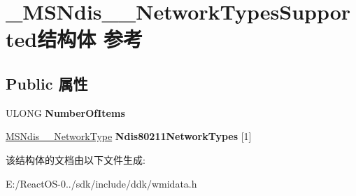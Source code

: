 \hypertarget{struct___m_s_ndis__80211___network_types_supported}{}\section{\+\_\+\+M\+S\+Ndis\+\_\+\_\+\+Network\+Types\+Supported结构体 参考}
\label{struct___m_s_ndis__80211___network_types_supported}
\subsection*{Public 属性}
\begin{DoxyCompactItemize}
\item 
\mbox{\label{struct___m_s_ndis__80211___network_types_supported_ab60604679e5fddfd0d099ff624b82bf8}} 
U\+L\+O\+NG {\bfseries Number\+Of\+Items}
\item 
\mbox{\label{struct___m_s_ndis__80211___network_types_supported_a9e5462e6a1bcb913862b9ef07001b77a}} 
\hyperlink{struct___m_s_ndis__80211___network_type}{M\+S\+Ndis\+\_\+\_\+\+Network\+Type} {\bfseries Ndis80211\+Network\+Types} \mbox{[}1\mbox{]}
\end{DoxyCompactItemize}


该结构体的文档由以下文件生成\+:\begin{DoxyCompactItemize}
\item 
E\+:/\+React\+O\+S-\/0../sdk/include/ddk/wmidata.\+h\end{DoxyCompactItemize}
